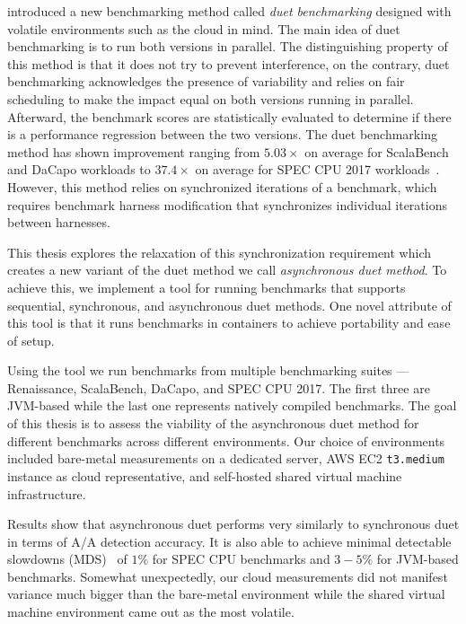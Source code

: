 \citet{bulej2020duet} introduced a new benchmarking method called \emph{duet benchmarking} designed with volatile environments such as the cloud in mind.
The main idea of duet benchmarking is to run both versions in parallel.
The distinguishing property of this method is that it does not try to prevent interference, on the contrary, duet benchmarking acknowledges the presence of variability and relies on fair scheduling to make the impact equal on both versions running in parallel.
Afterward, the benchmark scores are statistically evaluated to determine if there is a performance regression between the two versions.
The duet benchmarking method has shown improvement ranging from $5.03 \times$ on average for ScalaBench and DaCapo workloads to $37.4 \times$ on average for SPEC CPU 2017 workloads~\cite{bulej2020duet}.
However, this method relies on synchronized iterations of a benchmark, which requires benchmark harness modification that synchronizes individual iterations between harnesses.

This thesis explores the relaxation of this synchronization requirement which creates a new variant of the duet method we call \emph{asynchronous duet method}.
To achieve this, we implement a tool for running benchmarks that supports sequential, synchronous, and asynchronous duet methods.
One novel attribute of this tool is that it runs benchmarks in containers to achieve portability and ease of setup.

Using the tool we run benchmarks from multiple benchmarking suites --- Renaissance, ScalaBench, DaCapo, and SPEC CPU 2017.
The first three are \mbox{JVM-based} while the last one represents natively compiled benchmarks.
The goal of this thesis is to assess the viability of the asynchronous duet method for different benchmarks across different environments.
Our choice of environments included bare-metal measurements on a dedicated server, AWS EC2 \lstinline{t3.medium} instance as cloud representative, and self-hosted shared virtual machine infrastructure.

Results show that asynchronous duet performs very similarly to synchronous duet in terms of A/A detection accuracy.
It is also able to achieve minimal detectable slowdowns (MDS)~\cite{laaber2019software} of $1\%$ for SPEC CPU benchmarks and $3-5\%$ for \mbox{JVM-based} benchmarks.
Somewhat unexpectedly, our cloud measurements did not manifest variance much bigger than the \mbox{bare-metal} environment while the shared virtual machine environment came out as the most volatile.

